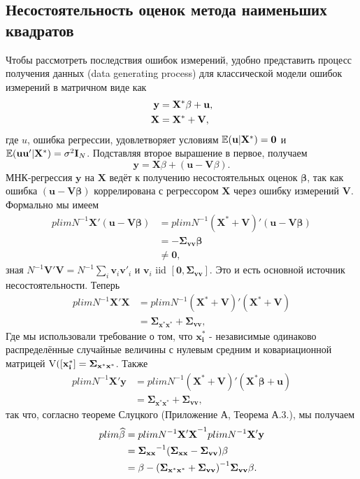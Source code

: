 \subsection{Несостоятельность оценок метода наименьших квадратов}  
Чтобы рассмотреть последствия ошибок измерений, удобно представить процесс получения данных (data generating process) для классической модели ошибок измерений в матричном виде как 
\begin{align}
\mathbf{y}&=\mathbf{X^*}\beta+\mathbf{u}, \\
\mathbf{X}&=\mathbf{X^*}+\mathbf{V}, \notag
\end{align}
где $u$, ошибка регрессии, удовлетворяет условиям $\mathbb{E}(\mathbf{u}|\mathbf{X^*})=\mathbf{0}$ и $\mathbb{E}(\mathbf{uu'}|\mathbf{X^*})=\sigma^2\mathbf{I}_N$. Подставляя второе вырашение в первое, получаем
\begin{equation}
\mathbf{y}=\mathbf{X}\beta+(\mathbf{u}-\mathbf{V}\beta).
\end{equation}
МНК-регрессия $\mathbf{y}$ на $\mathbf{X}$ ведёт к получению несостоятельных оценок $\mathbf{\beta}$, так как ошибка $(\mathbf{u}-\mathbf{V\beta})$ коррелирована с регрессором $\mathbf{X}$ через ошибку измерений $\mathbf{V}$.
Формально мы имеем
\begin{align*}
plim N^{-1}\mathbf{X'}(\mathbf{u}-\mathbf{V\beta})&=plimN^{-1}(\mathbf{X^*}+\mathbf{V})'(\mathbf{u}-\mathbf{V\beta}) \\
&=-\mathbf{\Sigma_{vv}}\mathbf{\beta} \\
&\neq\mathbf{0},
\end{align*}
зная $N^{-1}\mathbf{V'V}=N^{-1}\sum\limits_i\mathbf{v}_i\mathbf{v}'_i$ и $\mathbf{v}_i$ iid $[\mathbf{0}, \mathbf{\Sigma_{vv}}]$. Это и есть основной источник несостоятельности. Теперь 
\begin{align*}
plimN^{-1}\mathbf{X'X}&=plimN^{-1}(\mathbf{X^*+V})'(\mathbf{X^*+V}) \\
&=\mathbf{\Sigma_{x^*x^*}}+\mathbf{\Sigma_{vv}},
\end{align*}
Где мы использовали требование о том, что $\mathbf{x_i^*}$ - независимые одинаково распределённые случайные величины с нулевым средним и ковариационной матрицей $\mathrm{V}\mathbf{([x^*_i]}=\mathbf{\Sigma_{x^*x^*}}$. Также
\begin{align*}
plimN^{-1}\mathbf{X'y}&=plimN^{-1}(\mathbf{X^*+V})'(\mathbf{X^*\beta+u}) \\
&=\mathbf{\Sigma_{x^*x^*}}+\mathbf{\Sigma_{vv}},
\end{align*}
так что, согласно теореме Слуцкого (Приложение А, Теорема А.3.), мы получаем
\begin{align}
plim\mathbf{\widehat {\beta}}&={plimN^{-1}\mathbf{X'X}}^{-1}plimN^{-1}\mathbf{X'y} \\
&={\mathbf{\Sigma_{xx}}}^{-1}(\mathbf{\Sigma_{xx}}-\mathbf{\Sigma_{vv}})\mathbf{\beta} \notag \\
&=\mathbf{\beta}-{(\mathbf{\Sigma_{x^*x^*}}+\mathbf{\Sigma_{vv}})}^{-1}\mathbf{\Sigma_{vv}}\mathbf{\beta}. \notag 
\end{align}

